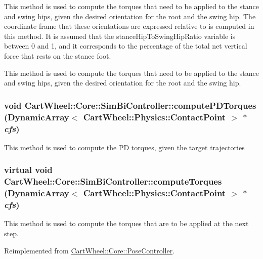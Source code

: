 \label{classCartWheel_1_1Core_1_1SimBiController_a5ee2b35043a54eecc824527cc1a1a575}
This method is used to compute the torques that need to be applied to the stance and swing hips, given the desired orientation for the root and the swing hip. The coordinate frame that these orientations are expressed relative to is computed in this method. It is assumed that the stanceHipToSwingHipRatio variable is between 0 and 1, and it corresponds to the percentage of the total net vertical force that rests on the stance foot.

This method is used to compute the torques that need to be applied to the stance and swing hips, given the desired orientation for the root and the swing hip. \hypertarget{classCartWheel_1_1Core_1_1SimBiController_ab519befed4078f3b3f6d32a01e8dd4f8}{
\subsubsection[{computePDTorques}]{\setlength{\rightskip}{0pt plus 5cm}void CartWheel::Core::SimBiController::computePDTorques (DynamicArray$<$ {\bf CartWheel::Physics::ContactPoint} $>$ $\ast$ {\em cfs})}}
\label{classCartWheel_1_1Core_1_1SimBiController_ab519befed4078f3b3f6d32a01e8dd4f8}
This method is used to compute the PD torques, given the target trajectories \hypertarget{classCartWheel_1_1Core_1_1SimBiController_aa6510698f1e27b154ace8e9459080322}{
\subsubsection[{computeTorques}]{\setlength{\rightskip}{0pt plus 5cm}virtual void CartWheel::Core::SimBiController::computeTorques (DynamicArray$<$ {\bf CartWheel::Physics::ContactPoint} $>$ $\ast$ {\em cfs})}}
\label{classCartWheel_1_1Core_1_1SimBiController_aa6510698f1e27b154ace8e9459080322}
This method is used to compute the torques that are to be applied at the next step. 

Reimplemented from \hyperlink{classCartWheel_1_1Core_1_1PoseController_a48cf8c4a4ef762251f03a01ed8c24cd0}{CartWheel::Core::PoseController}.



